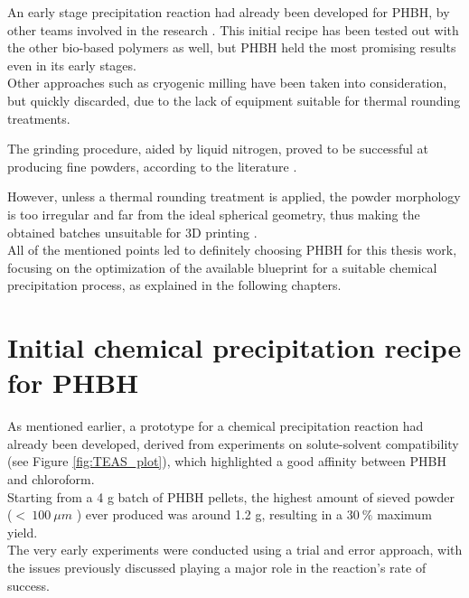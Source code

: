 \documentclass[a4paper]{article}
\begin{document}
    An early stage precipitation reaction had already been developed for PHBH, by other teams involved in the research \autocites{Messori_Bondioli_PHAs}. 
    This initial recipe has been tested out with the other bio-based polymers as well, but PHBH held the most promising 
    results even in its early stages. \\ 

    Other approaches such as cryogenic milling have been taken into consideration, but quickly 
    discarded, due to the lack of equipment suitable for thermal rounding treatments. 

    The grinding procedure, aided by liquid nitrogen, proved to be successful at producing fine powders, according to the literature \autocites{Dechet_Schmidt_thermal_rounding}. 

    However, unless a thermal rounding treatment is applied, the powder 
    morphology is too irregular and far from the ideal spherical geometry, thus making the 
    obtained batches unsuitable for 3D printing \autocites{Dechet_Schmidt_thermal_rounding}. \\  

    All of the mentioned points led to definitely choosing PHBH for this thesis work, focusing on the optimization of 
    the available blueprint for a suitable chemical 
    precipitation process, as explained in the following chapters. 

    \clearpage
    \section{Initial chemical precipitation recipe for PHBH\label{Initial_recipe}}
    
    As mentioned earlier, a prototype for a chemical precipitation reaction had already been developed, 
    derived from experiments on solute-solvent compatibility (see Figure \ref{fig:TEAS_plot}), 
    which highlighted a good affinity between PHBH and chloroform. \\ 

    Starting from a 4 g batch of PHBH pellets, the highest amount of sieved powder ($ < \ 100 \ \mu m$ )
    ever produced was around 1.2 g, resulting in a $30 \ \% $ maximum yield. \\ 

    The very early experiments were conducted using a trial and error approach, with the issues previously discussed 
    playing a major role in the reaction's rate of success. 
    
\end{document}
